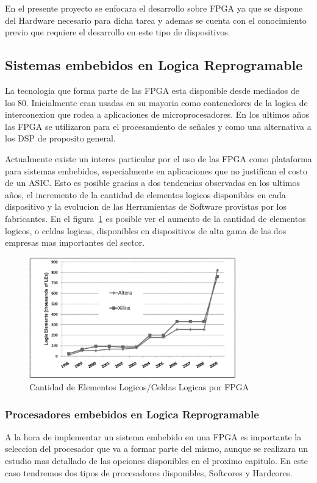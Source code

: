 En el presente proyecto se enfocara el desarrollo sobre FPGA ya que se dispone del Hardware necesario para dicha tarea y ademas se cuenta con el conocimiento previo que requiere el desarrollo en este tipo de dispositivos.
 

\subsection{Sistemas embebidos en Logica Reprogramable}

La tecnologia que forma parte de las FPGA esta disponible desde mediados de los 80. Inicialmente eran usadas en su mayoria como contenedores de la logica de interconexion que rodea a aplicaciones de microprocesadores. 
En los ultimos años las FPGA se utilizaron para el procesamiento de señales y como una alternativa a los DSP de proposito general.

Actualmente existe un interes particular por el uso de las FPGA como plataforma para sistemas embebidos, especialmente en aplicaciones que no justifican el costo de un ASIC. Esto es posible gracias a dos tendencias observadas en los ultimos años, el incremento de la cantidad de elementos logicos disponibles en cada dispositivo y la evolucion de las Herramientas de Software provistas por los fabricantes. En el figura~\ref{figa:elementoslogicos} es posible ver el aumento de la cantidad de elementos logicos, o celdas logicas, disponibles en dispositivos de alta gama de las dos empresas mas importantes del sector.

\begin{figure}[ht]
  \centering
	\includegraphics[width=0.80\textwidth]{2-sistema/graf/legrow.eps}
  \caption{Cantidad de Elementos Logicos/Celdas Logicas por FPGA}
  \label{figa:elementoslogicos}
\end{figure}

\newpage
\subsubsection{Procesadores embebidos en Logica Reprogramable}
A la hora de implementar un sistema embebido en una FPGA es importante la seleccion del procesador que va a formar parte del mismo, aunque se realizara un estudio mas detallado de las opciones disponibles en el proximo capitulo. En este caso tendremos dos tipos de procesadores disponibles, Softcores y Hardcores. 

